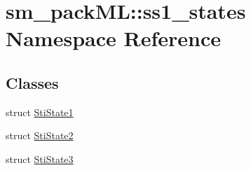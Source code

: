 \hypertarget{namespacesm__packML_1_1ss1__states}{}\section{sm\+\_\+pack\+ML\+:\+:ss1\+\_\+states Namespace Reference}
\label{namespacesm__packML_1_1ss1__states}
\subsection*{Classes}
\begin{DoxyCompactItemize}
\item 
struct \hyperlink{structsm__packML_1_1ss1__states_1_1StiState1}{Sti\+State1}
\item 
struct \hyperlink{structsm__packML_1_1ss1__states_1_1StiState2}{Sti\+State2}
\item 
struct \hyperlink{structsm__packML_1_1ss1__states_1_1StiState3}{Sti\+State3}
\end{DoxyCompactItemize}
